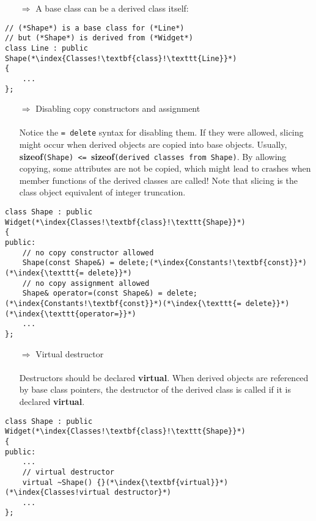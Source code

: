\documentclass[10pt]{book}
\begin{document}
\begin{enumerate}
\item[$\Rightarrow$] A base class can be a derived class itself:
\end{enumerate}
\begin{lstlisting}
// (*Shape*) is a base class for (*Line*)
// but (*Shape*) is derived from (*Widget*)
class Line : public Shape(*\index{Classes!\textbf{class}!\texttt{Line}}*)
{
    ...
};
\end{lstlisting}
\begin{enumerate}
\item[$\Rightarrow$] Disabling copy constructors and assignment\\ \\ Notice the \texttt{= delete} syntax for disabling them. If they were allowed, slicing might occur when derived objects are copied into base objects. Usually, \textbf{sizeof}\texttt{(Shape) <= }\textbf{sizeof}\texttt{(derived classes from Shape)}. By allowing copying, some attributes are not be copied, which might lead to crashes when member functions of the derived classes are called! Note that slicing is the class object equivalent of integer truncation.
\end{enumerate}
\begin{lstlisting}
class Shape : public Widget(*\index{Classes!\textbf{class}!\texttt{Shape}}*)
{
public:
    // no copy constructor allowed
    Shape(const Shape&) = delete;(*\index{Constants!\textbf{const}}*)(*\index{\texttt{= delete}}*)
    // no copy assignment allowed
    Shape& operator=(const Shape&) = delete;(*\index{Constants!\textbf{const}}*)(*\index{\texttt{= delete}}*)(*\index{\texttt{operator=}}*)
    ...
};
\end{lstlisting}
\begin{enumerate}
\item[$\Rightarrow$] Virtual destructor\\ \\ Destructors should be declared \textbf{virtual}. When derived
objects are referenced by base class pointers, the destructor of the derived class is called if it is declared \textbf{virtual}.
\end{enumerate}
\begin{lstlisting}
class Shape : public Widget(*\index{Classes!\textbf{class}!\texttt{Shape}}*)
{
public:
    ...
    // virtual destructor
    virtual ~Shape() {}(*\index{\textbf{virtual}}*)(*\index{Classes!virtual destructor}*)
    ...
};
\end{lstlisting}
\end{document}

